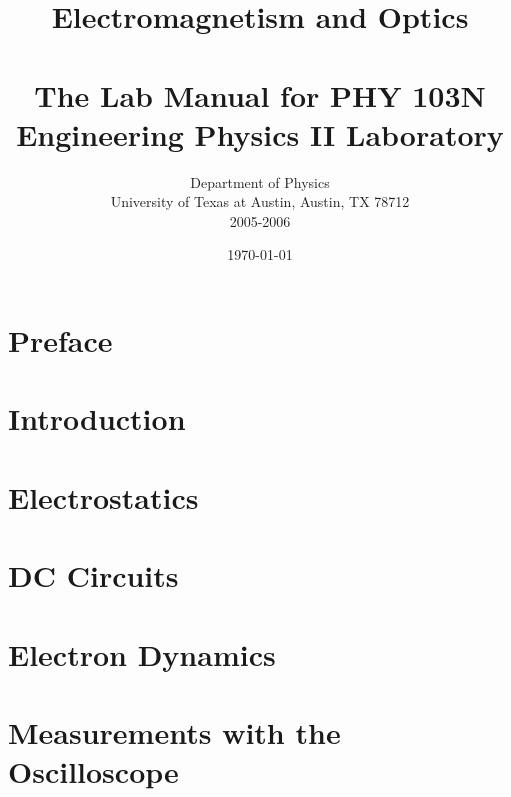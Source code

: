 \documentclass[12pt,letterpaper]{book}
\title{{\huge Electromagnetism and Optics} \\ 
\ \\
{\Large \bf The Lab Manual for PHY 103N \\
Engineering Physics II Laboratory }}
\author{ Department of Physics \\ 
 University of Texas at Austin, Austin, TX 78712\\
2005-2006}
\date{\today}
\begin{document}
\maketitle

\renewcommand{\thepage}{\roman{page}}

\tableofcontents

\renewcommand{\chaptername}{}
\renewcommand{\thechapter}{}

\chapter{Preface}  %


\renewcommand{\chaptername}{Chapter}

\renewcommand{\thepage}{\arabic{page}}
\setcounter{page}{0}

\renewcommand{\thechapter}{0}

\chapter{Introduction}
\label{ch:intro}


\renewcommand{\thechapter}{\arabic{chapter}}
\setcounter{chapter}{0}


\chapter{Electrostatics}


\chapter{DC Circuits}


\chapter{Electron Dynamics}


\chapter{Measurements with the Oscilloscope}

\end{document}
